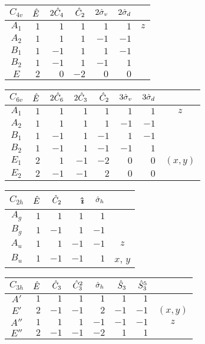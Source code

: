 \documentclass[../../Atom-ogMolekylefysik.tex]{subfiles}
\begin{document}
\vspace{1cm}

\begin{tabular}{c|r r r r r|c}
$C_{4v}$ & $\hat E$ & $2\hat C_4$ & $\hat C_2$ & $2\hat \sigma_v$ & $2\hat \sigma_d$\\\hline
$A_1$ & $1$ & $1$ & $1$ & $1$ & $1$ & $z$\\
$A_2$ & $1$ & $1$ & $1$ & $-1$ & $-1$\\
$B_1$ & $1$ & $-1$ & $1$ & $1$ & $-1$\\
$B_2$ & $1$ & $-1$ & $1$ & $-1$ & $1$\\
$E$ & $2$ & $0$ & $-2$ & $0$ & $0$
\end{tabular}

\vspace{1cm}

\begin{tabular}{c|r r r r r r|c}
$C_{6v}$ & $\hat E$ & $2\hat C_6$ & $2\hat C_3$ & $\hat C_2$ & $3\hat \sigma_v$ & $3\hat \sigma_d$\\\hline
$A_1$ & $1$ & $1$ & $1$ & $1$ & $1$ & $1$ & $z$\\
$A_2$ & $1$ & $1$ & $1$ & $1$ & $-1$ & $-1$\\
$B_1$ & $1$ & $-1$ & $1$ & $-1$ & $1$ & $-1$\\
$B_2$ & $1$ & $-1$ & $1$ & $-1$ & $-1$ & $1$\\
$E_1$ & $2$ & $1$ & $-1$ & $-2$ & $0$ & $0$ & $(x,y)$\\
$E_2$ & $2$ & $-1$ & $-1$ & $2$ & $0$ & $0$\\
\end{tabular}

\vspace{1cm}

\begin{tabular}{c|r r r r|c}
$C_{2h}$ & $\hat E$ & $\hat C_2$ & \textit{\^\i} & $\hat \sigma_h$\\\hline
$A_g$ & $1$ & $1$ & $1$& $1$\\
$B_g$ & $1$ & $-1$ & $1$& $-1$\\
$A_u$ & $1$ & $1$ & $-1$& $-1$ & $z$\\
$B_u$ & $1$ & $-1$ & $-1$& $1$ & $x$, $y$\\
\end{tabular}

\vspace{1cm}

\begin{tabular}{c|r r r r r r|c}
$C_{3h}$ & $\hat E$ & $\hat C_3$ & $\hat C_3^2$ & $\hat \sigma_h$ & $\hat S_3$ & $\hat S_3^5$\\\hline
$A'$ & $1$ & $1$ & $1$ & $1$ & $1$ & $1$\\
$E'$ & $2$ & $-1$ & $-1$ & $2$ & $-1$ & $-1$ & $(x,y)$\\
$A''$ & $1$ & $1$ & $1$ & $-1$ & $-1$ & $-1$ & $z$\\
$E''$ & $2$ & $-1$ & $-1$ & $-2$ & $1$ & $1$\\
\end{tabular}
\end{document}
